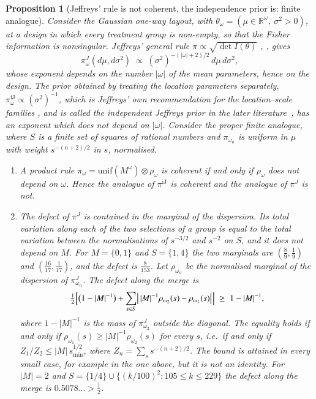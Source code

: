 \documentclass[11pt,a4paper]{article}
\theoremstyle{plain}
\newtheorem{proposition}[theorem]{Proposition}
\theoremstyle{definition}
\theoremstyle{remark}
\newcommand{\R}{\mathbb{R}}
\begin{document}
\begin{proposition}[Jeffreys' rule is not coherent, the independence prior
is: finite analogue]\label{wprop:jeffreys}
Consider the Gaussian one-way layout, with
$\theta_{\omega} = (\mu\in\R^{\omega},\ \sigma^{2}>0)$, at a design in which
every treatment group is non-empty, so that the Fisher information is
nonsingular. Jeffreys' general rule $\pi \propto \sqrt{\det I(\theta)}$
\cite{jeffreys_invariant_1946}, \cite[p.~1345, eq.~(1)]{kass_selection_1996},
gives
\[
\pi^{J}_{\omega}(d\mu, d\sigma^{2}) \;\propto\;
(\sigma^{2})^{-(|\omega|+2)/2}\,d\mu\,d\sigma^{2},
\]
whose exponent depends on the number $|\omega|$ of the mean parameters, hence
on the design. The prior obtained by treating the location parameters
separately, $\pi^{\mathrm{iJ}}_{\omega} \propto (\sigma^{2})^{-1}$, which is
Jeffreys' own recommendation for the location--scale families
\cite[pp.~182--183]{jeffreys_theory_1961},
\cite[p.~1345, eq.~(2)]{kass_selection_1996} and is called the independent
Jeffreys prior in the later
literature~\cite[pp.~631--632]{consonni_prior_2018}, has an exponent which does
not depend on $|\omega|$. Consider the proper finite analogue, where $S$ is a
finite set of squares of rational numbers and $\pi_{\omega_n}$ is uniform in
$\mu$ with weight $s^{-(n+2)/2}$ in $s$, normalised.
\begin{enumerate}
\item A product rule
$\pi_{\omega} = \mathrm{unif}(M^{\omega}) \otimes \rho_{\omega}$ is coherent if
and only if $\rho_{\omega}$ does not depend on $\omega$. Hence the analogue of
$\pi^{\mathrm{iJ}}$ is coherent and the analogue of $\pi^{J}$ is not.
\item The defect of $\pi^{J}$ is contained in the marginal of the dispersion.
Its total variation along each of the two selections of a group is equal to
the total variation between the normalisations of $s^{-3/2}$ and $s^{-2}$ on
$S$, and it does not depend on $M$. For $M=\{0,1\}$ and $S=\{1,4\}$ the two
marginals are $(\tfrac{8}{9},\tfrac{1}{9})$ and
$(\tfrac{16}{17},\tfrac{1}{17})$, and the defect is $\tfrac{8}{153}$. Let
$\rho_{\omega_n}$ be the normalised marginal of the dispersion of
$\pi^{J}_{\omega_n}$. The defect along the merge is
\[
\tfrac12\Bigl[\bigl(1-|M|^{-1}\bigr)
 + \sum_{s\in S}\bigl|\,|M|^{-1}\rho_{\omega_2}(s)-\rho_{\omega_1}(s)\bigr|\Bigr]
\;\ge\; 1-|M|^{-1},
\]
where $1-|M|^{-1}$ is the mass of $\pi^{J}_{\omega_2}$ outside the diagonal.
The equality holds if and only if
$\rho_{\omega_1}(s) \ge |M|^{-1}\rho_{\omega_2}(s)$ for every $s$, i.e.\ if and
only if $Z_{1}/Z_{2} \le |M|\,s_{\min}^{1/2}$, where
$Z_{n} = \sum_{s} s^{-(n+2)/2}$. The bound is attained in every small case, for
example in the one above, but it is not an identity. For $|M| = 2$ and
$S = \{1/4\} \cup \{(k/100)^{2} : 105 \le k \le 229\}$ the defect along the
merge is $0.5078\ldots > \tfrac12$.
\end{enumerate}
\end{proposition}
\end{document}
